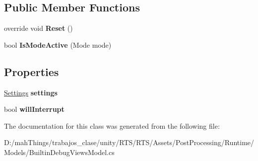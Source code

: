 \subsection*{Public Member Functions}
\begin{DoxyCompactItemize}
\item 
\mbox{\label{class_unity_engine_1_1_post_processing_1_1_builtin_debug_views_model_ad9e1b645a461131af7abfc318a45d9b0}} 
override void {\bfseries Reset} ()
\item 
\mbox{\label{class_unity_engine_1_1_post_processing_1_1_builtin_debug_views_model_a3c07a09b1bb7cfe08523d945fc982f1d}} 
bool {\bfseries Is\+Mode\+Active} (Mode mode)
\end{DoxyCompactItemize}
\subsection*{Properties}
\begin{DoxyCompactItemize}
\item 
\mbox{\label{class_unity_engine_1_1_post_processing_1_1_builtin_debug_views_model_acf518ba511401f5769463ceef698999a}} 
\mbox{\hyperlink{struct_unity_engine_1_1_post_processing_1_1_builtin_debug_views_model_1_1_settings}{Settings}} {\bfseries settings}
\item 
\mbox{\label{class_unity_engine_1_1_post_processing_1_1_builtin_debug_views_model_a0df7ee63e0c3191da3075438efb41636}} 
bool {\bfseries will\+Interrupt}
\end{DoxyCompactItemize}


The documentation for this class was generated from the following file\+:\begin{DoxyCompactItemize}
\item 
D\+:/mah\+Things/trabajos\+\_\+clase/unity/\+R\+T\+S/\+R\+T\+S/\+Assets/\+Post\+Processing/\+Runtime/\+Models/Builtin\+Debug\+Views\+Model.\+cs\end{DoxyCompactItemize}
